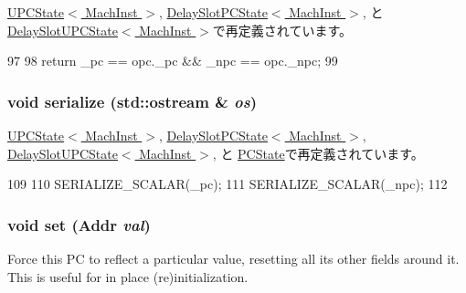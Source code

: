 \hyperlink{classGenericISA_1_1UPCState_accc92b38a5f2592fb8bc4a32dcd7355c}{UPCState$<$ MachInst $>$}, \hyperlink{classGenericISA_1_1DelaySlotPCState_ac87333e7d41d689a69647582933c9985}{DelaySlotPCState$<$ MachInst $>$}, と \hyperlink{classGenericISA_1_1DelaySlotUPCState_a3eaf06cc3c4e66eb1d29bafe9d140a8c}{DelaySlotUPCState$<$ MachInst $>$}で再定義されています。


\begin{DoxyCode}
97     {
98         return _pc == opc._pc && _npc == opc._npc;
99     }
\end{DoxyCode}
\hypertarget{classGenericISA_1_1PCStateBase_a53e036786d17361be4c7320d39c99b84}{
\subsubsection[{serialize}]{\setlength{\rightskip}{0pt plus 5cm}void serialize (std::ostream \& {\em os})}}
\label{classGenericISA_1_1PCStateBase_a53e036786d17361be4c7320d39c99b84}


\hyperlink{classGenericISA_1_1UPCState_a53e036786d17361be4c7320d39c99b84}{UPCState$<$ MachInst $>$}, \hyperlink{classGenericISA_1_1DelaySlotPCState_a53e036786d17361be4c7320d39c99b84}{DelaySlotPCState$<$ MachInst $>$}, \hyperlink{classGenericISA_1_1DelaySlotUPCState_a53e036786d17361be4c7320d39c99b84}{DelaySlotUPCState$<$ MachInst $>$}, と \hyperlink{classX86ISA_1_1PCState_a53e036786d17361be4c7320d39c99b84}{PCState}で再定義されています。


\begin{DoxyCode}
109     {
110         SERIALIZE_SCALAR(_pc);
111         SERIALIZE_SCALAR(_npc);
112     }
\end{DoxyCode}
\hypertarget{classGenericISA_1_1PCStateBase_a9a5b900e841dd75dc81970850547918f}{
\subsubsection[{set}]{\setlength{\rightskip}{0pt plus 5cm}void set ({\bf Addr} {\em val})}}
\label{classGenericISA_1_1PCStateBase_a9a5b900e841dd75dc81970850547918f}
Force this PC to reflect a particular value, resetting all its other fields around it. This is useful for in place (re)initialization.


